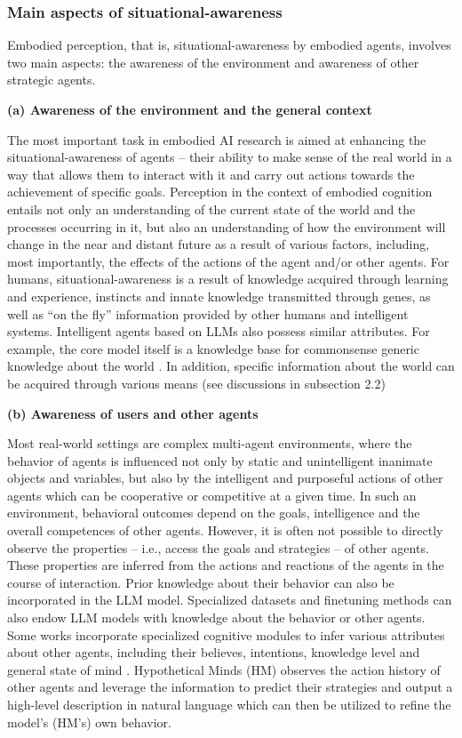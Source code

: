 \documentclass[10pt,journal,compsoc]{IEEEtran}
\begin{document}
	\subsubsection{Main aspects of situational-awareness}
	Embodied perception, that is, situational-awareness by embodied agents, involves two main aspects: the awareness of the environment and awareness of other strategic agents. 
	
	
	\textbf{(a) Awareness of the environment and the general context}
	
	
	The most important task in embodied AI research is aimed at enhancing the situational-awareness of agents – their ability to make sense of the real world in a way that allows them to interact with it and carry out actions towards the achievement of specific goals. Perception in the context of embodied cognition entails not only an understanding of the current state of the world and the processes occurring in it, but also an understanding of how the environment will change in the near and distant future as a result of various factors, including, most importantly, the effects of the actions of the agent and/or other agents. For humans, situational-awareness is a result of knowledge acquired through learning and experience, instincts and innate knowledge transmitted through genes, as well as “on the fly” information provided by other humans and intelligent systems.  Intelligent agents based on LLMs also possess similar attributes. For example, the core model itself is a knowledge base for commonsense generic knowledge about the world \cite{singhal2023large,liu2024gpt,chang2024survey,tu2024towards}. In addition, specific information about the world can be acquired through various means (see discussions in subsection 2.2)
	
	
	\textbf{(b) Awareness of users and other agents}
	
	Most real-world settings are complex multi-agent environments, where the behavior of agents is influenced not only by static and unintelligent inanimate objects and variables, but also by the intelligent and purposeful actions of other agents which can be cooperative or competitive at a given time.  In such an environment, behavioral outcomes depend on the goals, intelligence and the overall competences of other agents. However, it is often not possible to directly observe the properties – i.e., access the goals and strategies – of other agents. These properties are inferred from the actions and reactions of the agents in the course of interaction. Prior knowledge about their behavior can also be incorporated in the LLM model. Specialized datasets and finetuning methods can also endow LLM models with knowledge about the behavior or other agents.  Some works incorporate specialized cognitive modules to infer various attributes about other agents, including their believes, intentions, knowledge level and general state of mind \cite{cross2024hypothetical,chernyavskiy2024applying}. Hypothetical Minds (HM) \cite{cross2024hypothetical} observes the action history of other agents and leverage the information to predict their strategies and output a high-level description in natural language which can then be utilized to refine the model’s (HM’s) own behavior.
	
\end{document}
